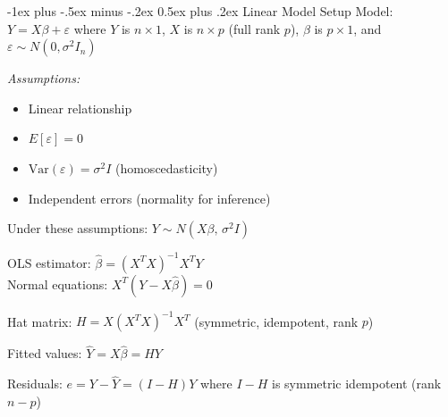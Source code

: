 \documentclass[6pt, landscape]{article}
\makeatletter
\renewcommand{\section}{\@startsection{section}{1}{0mm}%
                                {-1ex plus -.5ex minus -.2ex}%
                                {0.5ex plus .2ex}%
                                {\normalfont\bfseries}}
\newcommand{\keyformula}[1]{%
    \begin{tcolorbox}[colback=blue!5,colframe=blue!40!black,boxrule=0.5pt,arc=1pt,fontupper=\scriptsize]
        #1
    \end{tcolorbox}
}
\makeatother
\begin{document}
\begin{multicols}{3}
        \section{Linear Model Setup}
        Model: $Y = X\beta + \varepsilon$ where $Y$ is $n\times1$, $X$ is $n\times p$ (full rank $p$), $\beta$ is $p\times1$, and $\varepsilon \sim N(0,\sigma^2 I_n)$

        \textit{Assumptions:}
        \begin{itemize}[leftmargin=*,topsep=0pt,itemsep=0pt]
                \item Linear relationship
                \item $E[\varepsilon]=0$
                \item $\mathrm{Var}(\varepsilon)=\sigma^2 I$ (homoscedasticity)
                \item Independent errors (normality for inference)
        \end{itemize}

        Under these assumptions: $Y \sim N(X\beta,\,\sigma^2 I)$

        \keyformula{OLS estimator: $\hat{\beta} = (X^T X)^{-1} X^T Y$\\
                Normal equations: $X^T(Y - X\hat{\beta})=0$}

        Hat matrix: $H = X(X^T X)^{-1}X^T$ (symmetric, idempotent, rank $p$)

        Fitted values: $\hat{Y}=X\hat{\beta}=H Y$

        Residuals: $e = Y - \hat{Y} = (I - H)Y$ where $I-H$ is symmetric idempotent (rank $n-p$)

        \begin{center}
        \end{center}


\end{multicols}
\end{document}
